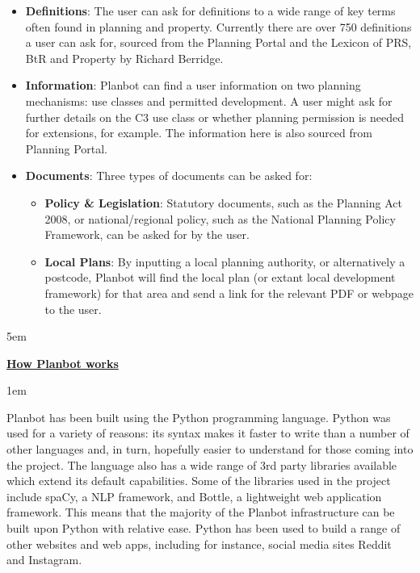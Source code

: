 \documentclass[12pt, a4paper]{article}
\begin{document}
    \begin{itemize}
      \item {\bfseries Definitions}: The user can ask for definitions to a
        wide range of key terms often found in planning and property.
        Currently there are over 750 definitions a user can ask for,
        sourced from the Planning Portal and the Lexicon of PRS, BtR and
        Property by Richard Berridge.
      \item {\bfseries Information}: Planbot can find a user information on
        two planning mechanisms: use classes and permitted development. A
        user might ask for further details on the C3 use class or whether
        planning permission is needed for extensions, for example. The
        information here is also sourced from Planning Portal.
      \item {\bfseries Documents}: Three types of documents can be asked
        for:
          \begin{itemize}
            \item {\bfseries Policy \& Legislation}: Statutory documents,
              such as the Planning Act 2008, or national/regional policy,
              such as the National Planning Policy Framework, can be
              asked for by the user.
            \item {\bfseries Local Plans}: By inputting a local planning
              authority, or alternatively a postcode, Planbot will find
              the local plan (or extant local development framework) for that
              area and send a link for the relevant PDF or webpage to the user.
          \end{itemize}
      \end{itemize}

    \parskip 5em

  {\large\bfseries\ul{How Planbot works}}

    \parskip 1em

  Planbot has been built using the Python programming language. Python was used
  for a variety of reasons: its syntax makes it faster to write than a number
  of other languages and, in turn, hopefully easier to understand for those
  coming into the project. The language also has a wide range of 3rd party
  libraries available which extend its default capabilities. Some of the
  libraries used in the project include spaCy, a NLP framework, and Bottle, a
  lightweight web application framework. This means that the majority of the
  Planbot infrastructure can be built upon Python with relative ease. Python
  has been used to build a range of other websites and web apps, including for
  instance, social media sites Reddit and Instagram.
\end{document}
